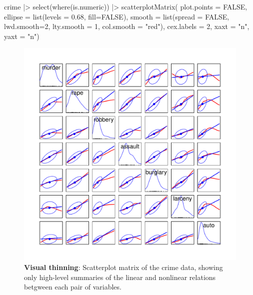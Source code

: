 \documentclass[
  letterpaper,
  10pt,
  krantz2]{krantz}
\makeatletter
\newenvironment{Shaded}{\begin{snugshade}}{\end{snugshade}}
\newcommand{\AttributeTok}[1]{\textcolor[rgb]{0.40,0.45,0.13}{#1}}
\newcommand{\ConstantTok}[1]{\textcolor[rgb]{0.56,0.35,0.01}{#1}}
\newcommand{\DecValTok}[1]{\textcolor[rgb]{0.68,0.00,0.00}{#1}}
\newcommand{\FloatTok}[1]{\textcolor[rgb]{0.68,0.00,0.00}{#1}}
\newcommand{\FunctionTok}[1]{\textcolor[rgb]{0.28,0.35,0.67}{#1}}
\newcommand{\NormalTok}[1]{\textcolor[rgb]{0.00,0.23,0.31}{#1}}
\newcommand{\SpecialCharTok}[1]{\textcolor[rgb]{0.37,0.37,0.37}{#1}}
\newcommand{\StringTok}[1]{\textcolor[rgb]{0.13,0.47,0.30}{#1}}
\newenvironment{kframe}{%
  \medskip{}
  \setlength{\fboxsep}{.8em}
  \def\at@end@of@kframe{}%
  \ifinner\ifhmode%
  \def\at@end@of@kframe{\end{minipage}}%
  \begin{minipage}{\columnwidth}%
  \fi\fi%
  \def\FrameCommand##1{\hskip\@totalleftmargin \hskip-\fboxsep
  \colorbox{shadecolor}{##1}\hskip-\fboxsep
      \hskip-\linewidth \hskip-\@totalleftmargin \hskip\columnwidth}%
  \MakeFramed {\advance\hsize-\width
    \@totalleftmargin\z@ \linewidth\hsize
    \@setminipage}}%
{\par\unskip\endMakeFramed%
  \at@end@of@kframe}
\renewenvironment{Shaded}{\begin{kframe}}{\end{kframe}}
\makeatother
\begin{document}
\begin{Shaded}
\begin{Highlighting}[]
\NormalTok{crime }\SpecialCharTok{|\textgreater{}}
  \FunctionTok{select}\NormalTok{(}\FunctionTok{where}\NormalTok{(is.numeric)) }\SpecialCharTok{|\textgreater{}}
  \FunctionTok{scatterplotMatrix}\NormalTok{(}
    \AttributeTok{plot.points =} \ConstantTok{FALSE}\NormalTok{,}
    \AttributeTok{ellipse =} \FunctionTok{list}\NormalTok{(}\AttributeTok{levels =} \FloatTok{0.68}\NormalTok{, }\AttributeTok{fill=}\ConstantTok{FALSE}\NormalTok{),}
    \AttributeTok{smooth =} \FunctionTok{list}\NormalTok{(}\AttributeTok{spread =} \ConstantTok{FALSE}\NormalTok{, }
                  \AttributeTok{lwd.smooth=}\DecValTok{2}\NormalTok{, }\AttributeTok{lty.smooth =} \DecValTok{1}\NormalTok{, }\AttributeTok{col.smooth =} \StringTok{"red"}\NormalTok{),}
    \AttributeTok{cex.labels =} \DecValTok{2}\NormalTok{,}
    \AttributeTok{xaxt =} \StringTok{"n"}\NormalTok{, }\AttributeTok{yaxt =} \StringTok{"n"}\NormalTok{)}
\end{Highlighting}
\end{Shaded}

\begin{figure}[H]

{\centering \includegraphics[width=1\textwidth,height=\textheight]{figs/ch03/fig-crime-spm-1.pdf}

}

\caption{\label{fig-crime-spm}\textbf{Visual thinning}: Scatterplot
matrix of the crime data, showing only high-level summaries of the
linear and nonlinear relations betgween each pair of variables.}

\end{figure}
\end{document}
